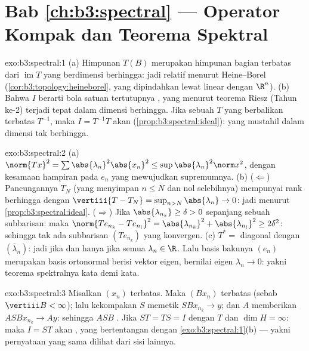 \section*{Bab \ref{ch:b3:spectral} --- Operator Kompak
dan Teorema Spektral}

\begin{solution}{exo:b3:spectral:1}
(a) Himpunan $T(B)$ merupakan himpunan bagian terbatas dari
$\operatorname{im}T$ yang berdimensi berhingga: jadi  relatif menurut Heine--Borel
(\cref{cor:b3:topology:heineborel}, yang dipindahkan lewat 
linear dengan $\R^n$).
(b) Bahwa $I$  berarti bola satuan tertutupnya , yang
menurut teorema Riesz (Tahun ke-2) terjadi tepat dalam dimensi
berhingga. Jika sebuah $T$ yang  berbalikan terbatas $T^{-1}$, maka
$I = T^{-1}T$ akan 
(\cref{prop:b3:spectral:ideal}): yang mustahil dalam dimensi
tak berhingga.
\end{solution}

\begin{solution}{exo:b3:spectral:2}
(a) $\norm{Tx}^2 = \sum\abs{\lambda_n}^2\abs{x_n}^2 \leq
\sup\abs{\lambda_n}^2\norm x^2$, dengan kesamaan hampiran pada
$e_n$ yang mewujudkan supremumnya.
(b) ($\Leftarrow$) Pancungannya $T_N$ (yang menyimpan $n \leq N$ dan
nol selebihnya) mempunyai rank berhingga dengan $\vertiii{T - T_N} =
\sup_{n>N}\abs{\lambda_n} \to 0$: jadi  menurut
\cref{prop:b3:spectral:ideal}. ($\Rightarrow$) Jika
$\abs{\lambda_{n_k}} \geq \delta > 0$ sepanjang sebuah subbarisan:
maka $\norm{Te_{n_k} - Te_{n_l}}^2 = \abs{\lambda_{n_k}}^2 +
\abs{\lambda_{n_l}}^2 \geq 2\delta^2$: sehingga tak ada subbarisan
$(Te_{n_k})$ yang konvergen.
(c) $T^* =$ diagonal dengan $(\bar\lambda_n)$: jadi  jika dan hanya jika
semua $\lambda_n \in \R$. Lalu basis bakunya $(e_n)$ merupakan
basis ortonormal berisi vektor eigen, bernilai eigen $\lambda_n \to
0$: yakni teorema spektralnya kata demi kata.
\end{solution}

\begin{solution}{exo:b3:spectral:3}
Misalkan $(x_n)$ terbatas. Maka $(Bx_n)$ terbatas
(sebab $\vertiii B < \infty$); lalu kekompakan $S$ memetik
$SBx_{n_k} \to y$; dan  $A$ memberikan $ASBx_{n_k} \to
Ay$: sehingga $ASB$ . Jika $ST = TS = I$ dengan $T$  dan
$\dim H = \infty$: maka $I = ST$ akan , yang bertentangan dengan
\cref{exo:b3:spectral:1}(b) --- yakni pernyataan yang sama
dilihat dari sisi lainnya.
\end{solution}

